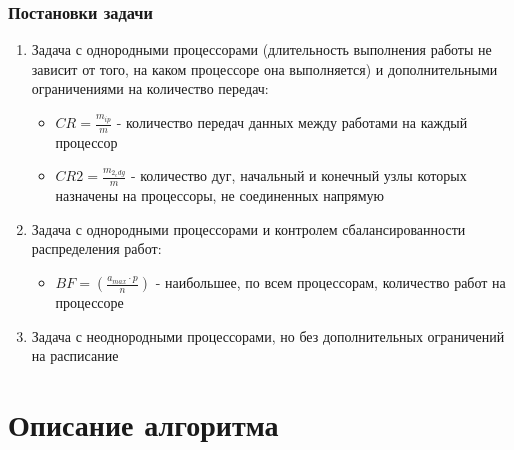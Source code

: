 \documentclass[hyperref=unicode, aspectratio=169]{beamer}
\begin{document}
\begin{frame}
    \frametitle{Постановки задачи}
    \begin{enumerate}
        \item Задача с однородными процессорами (длительность выполнения работы не зависит от того, на каком процессоре она выполняется) и дополнительными ограничениями на количество передач:
        \begin{itemize}
            \item $CR = \frac{m_{ip}}{m}$ - количество передач данных между работами на каждый процессор
            \item $CR2 = \frac{m_{2_edg}}{m}$ - количество дуг, начальный и конечный узлы которых назначены на процессоры, не соединенных напрямую
        \end{itemize}
        \item Задача с однородными процессорами и контролем сбалансированности распределения работ:
        \begin{itemize}
            \item $BF = \left( \frac{a_{max} \cdot p}{n} \right)$ - наибольшее, по всем процессорам, количество работ на процессоре
        \end{itemize}
        \item Задача с неоднородными процессорами, но без дополнительных ограничений на расписание
    \end{enumerate}
\end{frame}



\section{Описание алгоритма}
\end{document}
